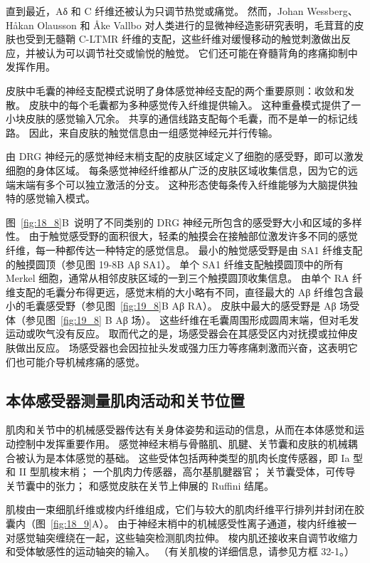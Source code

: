 直到最近，Aδ 和 C 纤维还被认为只调节热觉或痛觉。
然而，Johan Wessberg、Håkan Olausson 和 Åke Vallbo 对人类进行的显微神经造影研究表明，毛茸茸的皮肤也受到无髓鞘 C-LTMR 纤维的支配，这些纤维对缓慢移动的触觉刺激做出反应，并被认为可以调节社交或愉悦的触觉。
它们还可能在脊髓背角的疼痛抑制中发挥作用。


皮肤中毛囊的神经支配模式说明了身体感觉神经支配的两个重要原则：收敛和发散。
皮肤中的每个毛囊都为多种感觉传入纤维提供输入。
这种重叠模式提供了一小块皮肤的感觉输入冗余。
共享的通信线路支配每个毛囊，而不是单一的标记线路。 
因此，来自皮肤的触觉信息由一组感觉神经元并行传输。


由 DRG 神经元的感觉神经末梢支配的皮肤区域定义了细胞的感受野，即可以激发细胞的身体区域。
每条感觉神经纤维都从广泛的皮肤区域收集信息，因为它的远端末端有多个可以独立激活的分支。
这种形态使每条传入纤维能够为大脑提供独特的感觉输入模式。


图~\ref{fig:18_8}B~说明了不同类别的 DRG 神经元所包含的感受野大小和区域的多样性。
由于触觉感受野的面积很大，轻柔的触摸会在接触部位激发许多不同的感觉纤维，每一种都传达一种特定的感觉信息。
最小的触觉感受野是由 SA1 纤维支配的触摸圆顶（参见图 19-8B Aβ SA1）。
单个 SA1 纤维支配触摸圆顶中的所有 Merkel 细胞，通常从相邻皮肤区域的一到三个触摸圆顶收集信息。
由单个 RA 纤维支配的毛囊分布得更远，感觉末梢的大小略有不同，直径最大的 Aβ 纤维包含最小的毛囊感受野（参见图~\ref{fig:19_8}B Aβ RA）。
皮肤中最大的感受野是 Aβ 场受体（参见图~\ref{fig:19_8} B Aβ 场）。
这些纤维在毛囊周围形成圆周末端，但对毛发运动或吹气没有反应。
取而代之的是，场感受器会在其感受区内对抚摸或拉伸皮肤做出反应。
场感受器也会因拉扯头发或强力压力等疼痛刺激而兴奋，这表明它们也可能介导机械疼痛的感觉。



\subsection{本体感受器测量肌肉活动和关节位置}

肌肉和关节中的机械感受器传达有关身体姿势和运动的信息，从而在本体感觉和运动控制中发挥重要作用。
感觉神经末梢与骨骼肌、肌腱、关节囊和皮肤的机械耦合被认为是本体感觉的基础。
这些受体包括两种类型的肌肉长度传感器，即 Ia 型和 II 型肌梭末梢；
一个肌肉力传感器，高尔基肌腱器官；
关节囊受体，可传导关节囊中的张力；
和感觉皮肤在关节上伸展的 Ruffini 结尾。


肌梭由一束细肌纤维或梭内纤维组成，它们与较大的肌肉纤维平行排列并封闭在胶囊内（图~\ref{fig:18_9}A）。
由于神经末梢中的机械感受性离子通道，梭内纤维被一对感觉轴突缠绕在一起，这些轴突检测肌肉拉伸。
梭内肌还接收来自调节收缩力和受体敏感性的运动轴突的输入。
（有关肌梭的详细信息，请参见方框 32-1。）



